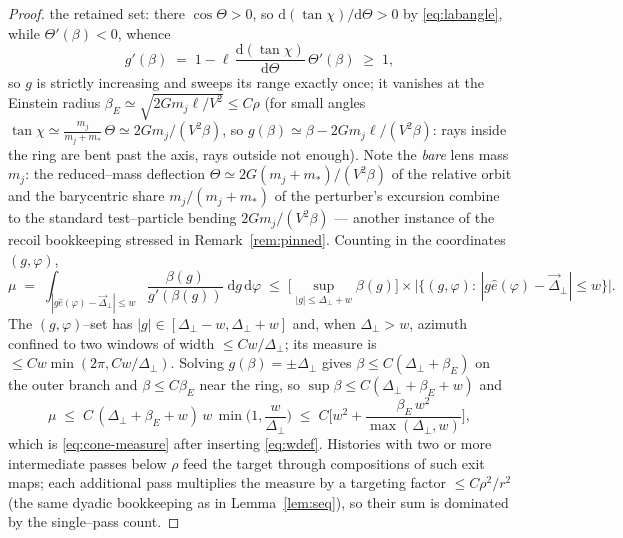 \documentclass[11pt]{article}
\newcommand{\dd}{\mathrm{d}}
\begin{document}
\begin{proof}
the retained set: there $\cos\Theta>0$, so $\dd(\tan\chi)/\dd\Theta>0$ by \eqref{eq:labangle},
while $\Theta'(\beta)<0$, whence
\begin{equation*}
  g'(\beta)\;=\;1-\ell\,\frac{\dd(\tan\chi)}{\dd\Theta}\,\Theta'(\beta)\;\ge\;1 ,
\end{equation*}
so $g$ is strictly increasing and sweeps its range exactly once; it vanishes at the Einstein
radius $\beta_E\simeq\sqrt{2Gm_j\ell/V^2}\le C\rho$ (for small angles
$\tan\chi\simeq\frac{m_j}{m_j+m_*}\,\Theta\simeq2Gm_j/(V^2\beta)$, so
$g(\beta)\simeq\beta-2Gm_j\ell/(V^2\beta)$: rays inside the ring are bent past the axis, rays
outside not enough). Note the \emph{bare} lens mass $m_j$: the reduced--mass deflection
$\Theta\simeq2G(m_j+m_*)/(V^2\beta)$ of the relative orbit and the barycentric share
$m_j/(m_j+m_*)$ of the perturber's excursion combine to the standard test--particle bending
$2Gm_j/(V^2\beta)$ --- another instance of the recoil bookkeeping stressed in
Remark~\ref{rem:pinned}. Counting in the coordinates $(g,\varphi)$,
\begin{equation*}
  \mu\;=\;\int_{|g\hat e(\varphi)-\vec\Delta_\perp|\le w}
  \frac{\beta(g)}{g'(\beta(g))}\;\dd g\,\dd\varphi
  \;\le\;\Big[\sup_{|g|\le\Delta_\perp+w}\beta(g)\Big]\times
  \big|\{(g,\varphi):\,|g\hat e(\varphi)-\vec\Delta_\perp|\le w\}\big| .
\end{equation*}
The $(g,\varphi)$--set has $|g|\in[\Delta_\perp-w,\Delta_\perp+w]$ and, when $\Delta_\perp>w$,
azimuth confined to two windows of width $\le Cw/\Delta_\perp$; its measure is
$\le Cw\min(2\pi,Cw/\Delta_\perp)$. Solving $g(\beta)=\pm\Delta_\perp$ gives
$\beta\le C(\Delta_\perp+\beta_E)$ on the outer branch and $\beta\le C\beta_E$ near the ring, so
$\sup\beta\le C(\Delta_\perp+\beta_E+w)$ and
\begin{equation*}
  \mu\;\le\;C\,(\Delta_\perp+\beta_E+w)\,w\,\min\Big(1,\frac{w}{\Delta_\perp}\Big)
  \;\le\;C\Big[w^2+\frac{\beta_E\,w^2}{\max(\Delta_\perp,w)}\Big],
\end{equation*}
which is \eqref{eq:cone-measure} after inserting \eqref{eq:wdef}. Histories with two or more
intermediate passes below $\rho$ feed the target through compositions of such exit maps; each
additional pass multiplies the measure by a targeting factor $\le C\rho^2/r^2$ (the same dyadic
bookkeeping as in Lemma~\ref{lem:seq}), so their sum is dominated by the single--pass count.


\end{proof}
\end{document}
